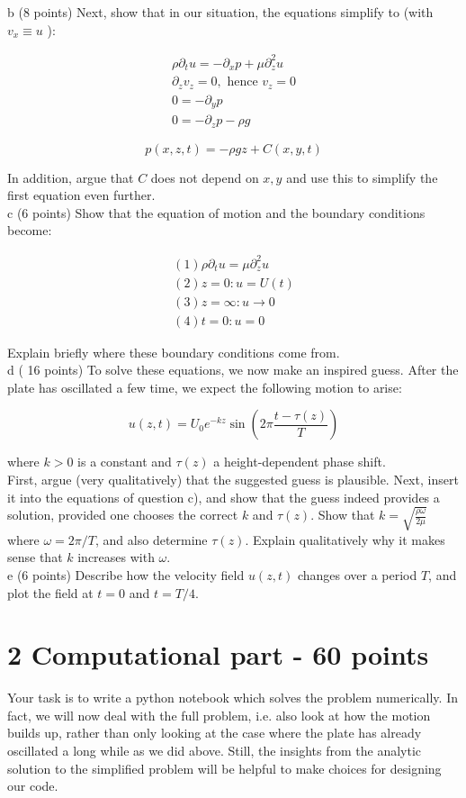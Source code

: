 \documentclass[10pt]{article}
\begin{document}
b (8 points) Next, show that in our situation, the equations simplify to (with \(v_{x} \equiv u\) ):

\[
\begin{gathered}
\rho \partial_{t} u=-\partial_{x} p+\mu \partial_{z}^{2} u \\
\partial_{z} v_{z}=0, \text { hence } v_{z}=0 \\
0=-\partial_{y} p \\
0=-\partial_{z} p-\rho g
\end{gathered}
\]

\[
p(x, z, t)=-\rho g z+C(x, y, t)
\]

In addition, argue that \(C\) does not depend on \(x, y\) and use this to simplify the first equation even further.\\
c (6 points) Show that the equation of motion and the boundary conditions become:

\[
\begin{gathered}
(1) \rho \partial_{t} u=\mu \partial_{z}^{2} u \\
(2) z=0: u=U(t) \\
(3) z=\infty: u \rightarrow 0 \\
(4) t=0: u=0
\end{gathered}
\]

Explain briefly where these boundary conditions come from.\\
d ( 16 points) To solve these equations, we now make an inspired guess. After the plate has oscillated a few time, we expect the following motion to arise:

\[
u(z, t)=U_{0} e^{-k z} \sin \left(2 \pi \frac{t-\tau(z)}{T}\right)
\]

where \(k>0\) is a constant and \(\tau(z)\) a height-dependent phase shift.\\
First, argue (very qualitatively) that the suggested guess is plausible. Next, insert it into the equations of question c), and show that the guess indeed provides a solution, provided one chooses the correct \(k\) and \(\tau(z)\). Show that \(k=\sqrt{\frac{\rho \omega}{2 \mu}}\) where \(\omega=2 \pi / T\), and also determine \(\tau(z)\). Explain qualitatively why it makes sense that \(k\) increases with \(\omega\).\\
e (6 points) Describe how the velocity field \(u(z, t)\) changes over a period \(T\), and plot the field at \(t=0\) and \(t=T / 4\).

\section*{2 Computational part - 60 points}
Your task is to write a python notebook which solves the problem numerically. In fact, we will now deal with the full problem, i.e. also look at how the motion builds up, rather than only looking at the case where the plate has already oscillated a long while as we did above. Still, the insights from the analytic solution to the simplified problem will be helpful to make choices for designing our code.
\end{document}
